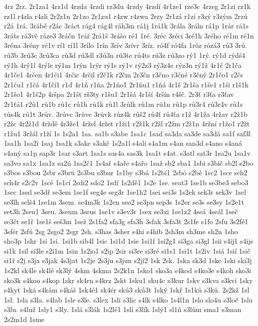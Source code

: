 {4rz
2rz.
2r1za1
4rz1d
4rzda
4rzdi
rz3du
4rzdy
4rzdí
4r1ze1
rze3c
4rzeg
2r1zi
rz1k
rz1l
r4zla
r4zli
2r2z1n
2r1zo
2r1zu1
r4zw
r4zwa
2rzy
2r1zá
r1zí
r3zý
r3zým
2rzů
r2á
1rá.
3rábě
r2ác
3ráct
rág4
rág4l
ráh3m
rá1j
1rá1k
3rála
3ráln
rá1p
1rár
rá1s
3ráts
rá3vě
ráze3
3ráčn
1rář
2rá1š
3rášo
ré1
1ré.
3réc
3réci
3ré1h
3rého
ré1m
ré1n
3réna
3rény
ré1v
rí1
rí1l
3rílo
1rín
3rív
3rívr
3ríz.
ró4f
ró4fa
1róz
rózá3
rú3
3rú.
rú3b
3rú3c
3rú3ca
rú3d
rú3dl
r3ú3n
rú3te
rú4ts
rú3z
rú3zo
rý1
1rý.
rý1d
rýdš4
rý1h
4rý1l
4rýle
rý1m
1rýn
1rýr
rý1s
rý1v
rý2z3
rý3z4e
rýz3n
rý1ž
4r1č
2r1ča
4r1če1
4rčen
4r1či1
4rčic
4rčil
r2č1k
r2čm
2r3čn
r3čno
r3čné
r3čný
2r1čo1
r2čs
2r1ču1
r1čá
4r1čí1
r1ď
4r1ň
r1ňa
2r1ňo1
2r1ňu1
r1ňá
4r1š
2r1ša
r1še1
r1ši
r1š1k
2r1šo1
4r1š2p
4ršpa
2r1št
rš3ty
r1šu1
2r1šá
4r1ší
4ršín
r4šč.
2r3ť
r3ťa
r3ťav
2r1ťá1
r2ů1
rů1b
rů1c
rů1h
rů1k
rů1l
3růlk
rů1m
rů1n
rů1p
rů3r4
rů3r4v
rů1s
růs4k
rů1t
3rův.
3růvc
3růve
3růvk
růz4k
růš2
rů4ť
rů4ťa
r1ž
4r1ža
4ržav
r2ž1b
r2žc
4r2ž1d
4rždě
4r3že1
4ržel
4ržet
r1ži1
r2ž1k
r2žl
r2žm
r2ž1n
4ržní
r1žo1
r2žt
r1žu1
3ržál
r1ží
1s
1s2a1
1sa.
sa1b
s3abe
1sa1c
1sad
sa3da
sa3de
sa3dá
sa1f
saf3l
1sa1h
1sa2i
1saj
1sa1k
s3akc
s3akč
1s2a1l
s4ali
s4a1m
s4an
san3d
s4ano
s4aná
s4aný
sa1p
sap3r
1sar
s3art
1sa1s
sas4a
sas3k
1sa1t
s4at.
s3atl
sat3r
1sa2u
1sa1v
sa3vo
sa1x
1sa1z
sa2ú
1sa2č1
1s4ař
s4aře
s4ařo
1saž
sb2
sba1
1sbi
s3bič
sb2l
s2bo
s3bos
s3bou
2sbr
s3brü
2s3bu
s3bur
1s1by
s3bá
1s2bí1
2sbó
s2bě
1sc2
1sce
sch2
sch4r
s2c2v
1scé
1s1cí
2sdi2
sdo2
1sdí
1s2dě1
1s2e
1se.
seat3
1se1b
se3be3
sebo3
1sec
1sed
se3dř
se3em
1se1f
seg4e
seg3r
1se1h2
1sei
sei3s
1s2ek
sek3r
sek3v
1sel
se3lh
selš4
1se1m
3sem.
se4m3k
1s2en
seo2
se3pn
sep3s
1s2er
se3s
se3sy
1s2e1t
set3h
2seu1
3seu.
3seum
3seus
1se1v
s3ev3r
1sex
se3xi
1se1z2
4seá
4seál
1seč
se3čt
se1ř
1se1š
seš3m
1sež
2s1fa2
sfa3g
sfa3h
3sfak
3sfa3t
2s1fe
s1fo
2sfu
3s2fé1
3sfér
2sfú
2sg
2sgo2
2sgr
2sh.
s3has
3sher
s4hi
s4hib
2sh3m
sh3me
sh2n
1sho
sho3p
1shr
1si
1si.
1si1b
sib4l
1sic
1si1d
1sie
1si1f
1si2g1
si3ga
si3gl
1sii
s4ij1
s4ijs
si1k
1sil
si3le
s2i1m
1sin
1s2io1
s2ip
2sir
si3re
si3ré
si1s1
1si1t
1s2iv
1siá
1sií
1sič
si1ř
s2j
s3ja
s3jak
4s3jat
1s2je
2s3ju
s3jun
s2jí2
1sk
2sk.
1ska
sk3d
1ske
1ski
ski3j
1s2kl
sk4le
sk4lé
sk3lý
4skm
4skma
2s2k1n
1sko1
sko3a
s4kod
s4ko3e
s4koh
sko3i
sko3k
s4koo
s4kop
1skr
sk4rn
s4krz
2skt
1sku1
sku4c
s3kur
1skv
s3kva
s3kvi
1sky
s4kyt
1ská
s4kám
s4káš
1sk4é1
sk4ér
skú3
skú3t
1ský
1skř
1s1ků
s3ků.
2s2kž
1sl
1sl.
1sla
s3la.
s4lab
1sle
s3le.
s3lex
1sli
s3lic
s4lk
s4lko
1s4l1n
1slo
slo4u
s3loč
1slu
s3lu.
s4luž
1sly1
s3ly.
1slá
s3lák
1s2lé1
1slí
s3lík
1slý1
sl1ň
s3lům
sma1
s3man
2s2m1d
1sme
}
